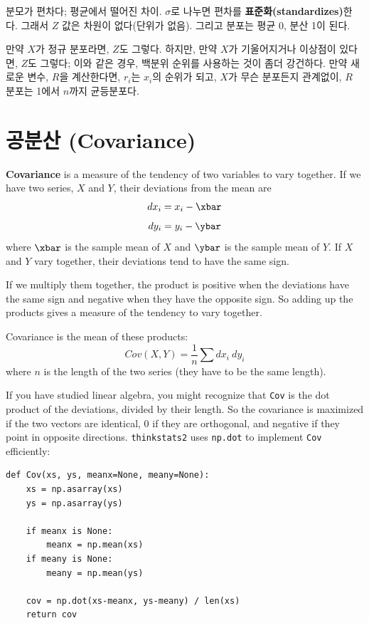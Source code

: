 분모가 편차다; 평균에서 떨어진 차이. $\sigma$로 나누면 편차를 {\bf 표준화(standardizes)}한다. 그래서 $Z$ 값은 차원이 없다(단위가 없음). 그리고 분포는 평균 0, 분산 1이 된다.

만약 $X$가 정규 분포라면, $Z$도 그렇다. 하지만, 만약 $X$가 기울어지거나 이상점이 있다면, $Z$도 그렇다; 이와 같은 경우, 백분위 순위를 사용하는 것이 좀더 강건하다.
만약 새로운 변수, $R$을 계산한다면, $r_i$는 $x_i$의 순위가 되고, $X$가 무슨 분포든지 관계없이, $R$ 분포는 1에서 $n$까지 균등분포다.



\section{공분산 (Covariance)}

{\bf Covariance} is a measure of the tendency of two variables
to vary together.  If we have two series, $X$ and $Y$, their
deviations from the mean are
%
\[ dx_i = x_i - \xbar \]
\[ dy_i = y_i - \ybar \]
%
where $\xbar$ is the sample mean of $X$ and $\ybar$ is the sample mean
of $Y$.  If $X$ and $Y$ vary together, their deviations tend to have
the same sign.

If we multiply them together, the product is positive when the
deviations have the same sign and negative when they have the opposite
sign.  So adding up the products gives a measure of the tendency to
vary together.

Covariance is the mean of these products:
%
\[ Cov(X,Y) = \frac{1}{n} \sum dx_i~dy_i \]
%
where $n$ is the length of the two series (they have to be the same
length).

If you have studied linear algebra, you might recognize that
{\tt Cov} is the dot product of the deviations, divided
by their length.  So the covariance is maximized if the two vectors
are identical, 0 if they are orthogonal, and negative if they
point in opposite directions.  {\tt thinkstats2} uses {\tt np.dot} to
implement {\tt Cov} efficiently:

\begin{verbatim}
def Cov(xs, ys, meanx=None, meany=None):
    xs = np.asarray(xs)
    ys = np.asarray(ys)

    if meanx is None:
        meanx = np.mean(xs)
    if meany is None:
        meany = np.mean(ys)

    cov = np.dot(xs-meanx, ys-meany) / len(xs)
    return cov
\end{verbatim}

